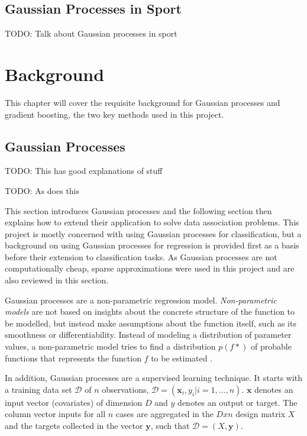 \documentclass[12pt,a4paper]{report}
\theoremstyle{definition}
\begin{document}
\section{Gaussian Processes in Sport}

TODO: Talk about Gaussian processes in sport

\chapter{Background}

This chapter will cover the requisite background for Gaussian processes and gradient boosting, the two key methods used in this project.

\section{Gaussian Processes}

\citep{Yi2019} TODO: This has good explanations of stuff

\citep{Griffiths2023} TODO: As does this

This section introduces Gaussian processes and the following section then explains how to extend their application to solve data association problems. 
This project is mostly concerned with using Gaussian processes for classification, but a background on using Gaussian processes for regression is provided first as a basis before their extension to classification tasks. 
As Gaussian processes are not computationally cheap, sparse approximations were used in this project and are also reviewed in this section.

Gaussian processes are a non-parametric regression model. 
\emph{Non-parametric models} are not based on insights about the concrete structure of the function to be modelled, but instead make assumptions about the function itself, such as its smoothness or differentiability. 
Instead of modeling a distribution of parameter values, a non-parametric model tries to find a distribution $p(f*)$ of probable functions that represents the function $f$ to be estimated \citep{Kaiser2017}.

In addition, Gaussian processes are a supervised learning technique. 
It starts with a training data set $\mathcal{D}$ of $n$ observations, $\mathcal{D} = (\textbf{x}_{i}, y_{i} | i = 1, ..., n)$.
$\textbf{x}$ denotes an input vector (covariates) of dimension $D$ and $y$ denotes an output or target. 
The column vector inputs for all $n$ cases are aggregated in the $D x n$ design matrix $X$ and the targets collected in the vector $\textbf{y}$, such that $\mathcal{D} = (X, \textbf{y})$.
\end{document}
